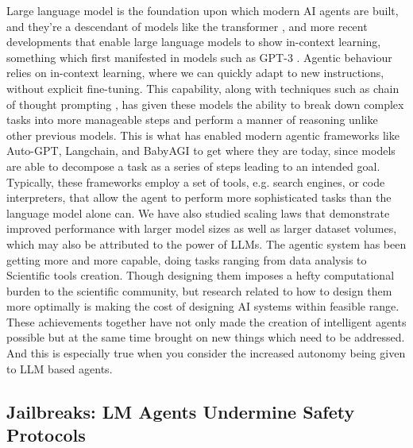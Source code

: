 Large language model is the foundation upon which modern AI agents are built, and they're a descendant of models like the transformer \cite{Vaswani2017Attention}, and more recent developments that enable large language models to show in-context learning, something which first manifested in models such as GPT-3 \cite{Brown2020Language}. Agentic behaviour relies on in-context learning, where we can quickly adapt to new instructions, without explicit fine-tuning. This capability, along with techniques such as chain of thought prompting \cite{Wei2022Chainofthought}, has given these models the ability to break down complex tasks into more manageable steps and perform a manner of reasoning unlike other previous models. This is what has enabled modern agentic frameworks like Auto-GPT, Langchain, and BabyAGI to get where they are today, since models are able to decompose a task as a series of steps leading to an intended goal\cite{barua2024exploring}. Typically, these frameworks employ a set of tools, e.g. search engines, or code interpreters, that allow the agent to perform more sophisticated tasks than the language model alone can. We have also studied scaling laws \cite{Kaplan2020Scaling} that demonstrate improved performance with larger model sizes as well as larger dataset volumes, which may also be attributed to the power of LLMs. The agentic system has been getting more and more capable, doing tasks ranging from data analysis\cite{barua2023kaxai} to Scientific tools creation\cite{barua2024pygen}. Though designing them imposes a hefty computational burden to the scientific community, but research related to how to design them more optimally is making the cost of designing AI systems within feasible range\cite{barua2024elmagic}.  These achievements together have not only made the creation of intelligent agents possible but at the same time brought on new things which need to be addressed. And this is especially true when you consider the increased autonomy being given to LLM based agents.



\subsection{Jailbreaks: LM Agents Undermine Safety Protocols}

